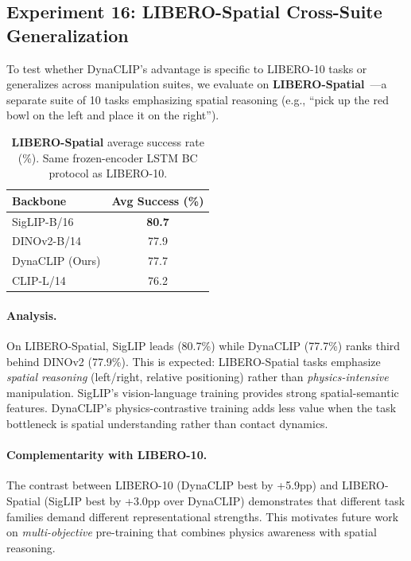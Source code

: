 \documentclass{article}
\newcommand{\methodname}{DynaCLIP}
\newcommand{\best}[1]{\textbf{#1}}
\begin{document}
\subsection{Experiment 16: LIBERO-Spatial Cross-Suite Generalization}
\label{sec:exp_libero_spatial}

To test whether \methodname{}'s advantage is specific to LIBERO-10 tasks or generalizes across manipulation suites, we evaluate on \textbf{LIBERO-Spatial}~\cite{liu2024libero}---a separate suite of 10 tasks emphasizing spatial reasoning (e.g., ``pick up the red bowl on the left and place it on the right'').

\begin{table}
\vspace{-1.5em}
\centering
\caption{\textbf{LIBERO-Spatial} average success rate (\%). Same frozen-encoder LSTM BC protocol as LIBERO-10.}
\label{tab:libero_spatial}
\small
\begin{tabular}{@{}lc@{}}
\toprule
\textbf{Backbone} & \textbf{Avg Success (\%)} \\
\midrule
SigLIP-B/16 & \best{80.7} \\
DINOv2-B/14 & 77.9 \\
\methodname{} (Ours) & 77.7 \\
CLIP-L/14 & 76.2 \\
\bottomrule
\end{tabular}
\vspace{-1em}
\end{table}

\paragraph{Analysis.} On LIBERO-Spatial, SigLIP leads (80.7\%) while \methodname{} (77.7\%) ranks third behind DINOv2 (77.9\%). This is expected: LIBERO-Spatial tasks emphasize \emph{spatial reasoning} (left/right, relative positioning) rather than \emph{physics-intensive} manipulation. SigLIP's vision-language training provides strong spatial-semantic features. \methodname{}'s physics-contrastive training adds less value when the task bottleneck is spatial understanding rather than contact dynamics.

\paragraph{Complementarity with LIBERO-10.} The contrast between LIBERO-10 (\methodname{} best by +5.9pp) and LIBERO-Spatial (SigLIP best by +3.0pp over \methodname{}) demonstrates that different task families demand different representational strengths. This motivates future work on \emph{multi-objective} pre-training that combines physics awareness with spatial reasoning.
\end{document}
